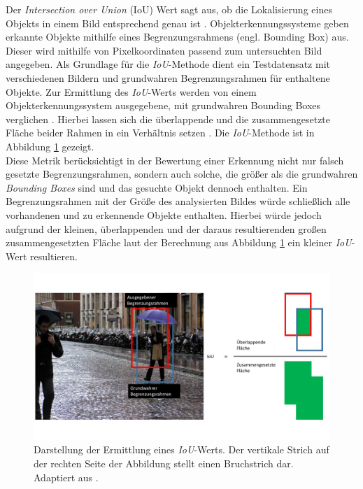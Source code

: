 		
		Der \textit{Intersection over Union} (IoU) Wert sagt aus, ob die Lokalisierung eines Objekts in einem Bild entsprechend genau ist \cite{ioupaper}. Objekterkennungssysteme geben erkannte Objekte mithilfe eines Begrenzungsrahmens (engl. Bounding Box) aus. Dieser wird mithilfe von Pixelkoordinaten passend zum untersuchten Bild angegeben. Als Grundlage für die \textit{IoU}-Methode dient ein Testdatensatz mit verschiedenen Bildern und grundwahren Begrenzungsrahmen für enthaltene Objekte. Zur Ermittlung des \textit{IoU}-Werts werden von einem Objekterkennungssystem ausgegebene, mit grundwahren Bounding Boxes verglichen \cite{ioupaper}. Hierbei lassen sich die überlappende und die zusammengesetzte Fläche beider Rahmen in ein Verhältnis setzen \cite{ioupaper}. Die \textit{IoU}-Methode ist in Abbildung \ref{fig: iou} gezeigt.\\
		
		Diese Metrik berücksichtigt in der Bewertung einer Erkennung nicht nur falsch gesetzte Begrenzungsrahmen, sondern auch solche, die größer als die grundwahren \textit{Bounding Boxes} sind und das gesuchte Objekt dennoch enthalten. Ein Begrenzungsrahmen mit der Größe des analysierten Bildes würde schließlich alle vorhandenen und zu erkennende Objekte enthalten. Hierbei würde jedoch aufgrund der kleinen, überlappenden und der daraus resultierenden großen zusammengesetzten Fläche laut der Berechnung aus Abbildung \ref{fig: iou} ein kleiner \textit{IoU}-Wert resultieren.\\
		
				\begin{figure}[H]
			\centering
			\includegraphics[width=1\textwidth]{Bilder/iouc.pdf}
			\caption{Darstellung der Ermittlung eines \textit{IoU}-Werts. Der vertikale Strich auf der rechten Seite der Abbildung stellt einen Bruchstrich dar. Adaptiert aus \cite{ioupng}.}
			\label{fig: iou}
		\end{figure}
		
